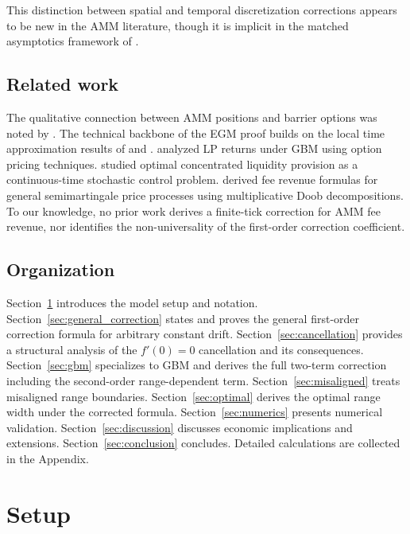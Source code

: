 \documentclass[11pt]{article}
\theoremstyle{definition}
\theoremstyle{remark}
\begin{document}
This distinction between spatial and temporal discretization
corrections appears to be new in the AMM literature, though it is
implicit in the matched asymptotics framework of
\citet{HowisonSteinberg2007}.

\subsection{Related work}

The qualitative connection between AMM positions and barrier options
was noted by \citet{Paone2025}. The technical backbone of the EGM
proof builds on the local time approximation results of
\citet{GobetLandon2014} and \citet{GobetStazhynski2020}.
\citet{ClarkHassani2023} analyzed LP returns under GBM using option
pricing techniques. \citet{FukasawaMajoWorhacz2023} studied optimal
concentrated liquidity provision as a continuous-time stochastic
control problem. \citet{CartaFabrizio2024} derived fee revenue
formulas for general semimartingale price processes using
multiplicative Doob decompositions. To our knowledge, no prior work
derives a finite-tick correction for AMM fee revenue, nor identifies
the non-universality of the first-order correction coefficient.

\subsection{Organization}

Section~\ref{sec:setup} introduces the model setup and notation.
Section~\ref{sec:general_correction} states and proves the general
first-order correction formula for arbitrary constant drift.
Section~\ref{sec:cancellation} provides a structural analysis of the
$f'(0) = 0$ cancellation and its consequences.
Section~\ref{sec:gbm} specializes to GBM and derives the full
two-term correction including the second-order range-dependent term.
Section~\ref{sec:misaligned} treats misaligned range boundaries.
Section~\ref{sec:optimal} derives the optimal range width under the
corrected formula. Section~\ref{sec:numerics} presents numerical
validation. Section~\ref{sec:discussion} discusses economic
implications and extensions. Section~\ref{sec:conclusion} concludes.
Detailed calculations are collected in the Appendix.

\section{Setup}\label{sec:setup}
\end{document}
